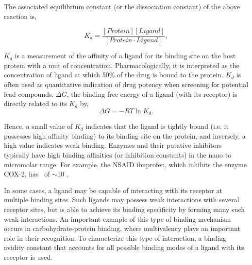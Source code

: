 The associated equilibrium constant (or the dissociation constant) of the above reaction is,

 \begin{equation}
  K_{d} = \frac{\left[ Protein \right]\left[ Ligand \right]}{\left[Protein \cdot Ligand\right]},
 \end{equation}

$K_d$ is a measurement of the affinity of a ligand for its binding site on the host protein with a unit of concentration. Pharmacologically, it is interpreted as the concentration of ligand at which 50\% of the drug is bound to the protein. $K_d$ is often used as quantitative indication of drug potency when screening for potential lead compounds. $\Delta G$, the binding free energy of a ligand (with its receptor) is directly related to its $K_{d}$ by,
\begin{equation}
	\Delta G = -RT\ln K_{d}.
\end{equation}


Hence, a small value of $K_{d}$ indicates that the ligand is tightly bound (i.e. it possesses high affinity binding) to its binding site on the protein, and inversely, a high value indicates weak binding. Enzymes and their putative inhibitors typically have high binding affinities (or inhibition constants) in the nano to micromolar range. For example, the NSAID ibuprofen, which inhibits the enzyme COX-2, has \KD\ of $\sim$10 \micromolar.\cite{Cryer:1998ti} 

In some cases, a ligand may be capable of interacting with its receptor at multiple binding sites. Such ligands may possess weak interactions with several receptor sites, but is able to achieve its binding specificity by forming many such weak interactions. An important example of this type of binding mechanism occurs in carbohydrate-protein binding, where multivalency plays an important role in their recognition. To characterize this type of interaction, a binding avidity constant that accounts for all possible binding modes of a ligand with its receptor is used.\cite{Krishnamurthy:2006vi}

